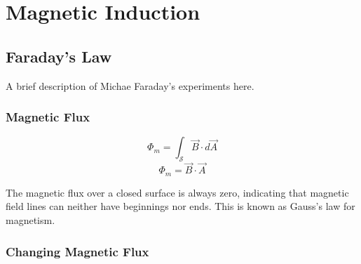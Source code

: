 \chapter{Magnetic Induction}
\label{chapter:faradays-law}


\section{Faraday's Law}

A brief description of Michae Faraday's experiments here.

\subsection{Magnetic Flux}
%
%

%  
%    
\begin{equation}
  \Phi_m=\int_\mathcal{S}\vec B\cdot d\vec A
\end{equation}
\begin{equation}
  \boxed{ \Phi_m=\vec B\cdot\vec A }
\end{equation} 


%
%
%
%
%  
The magnetic flux over a closed surface is always zero, indicating that
magnetic field lines can neither have beginnings nor ends. This is known as
Gauss's law for magnetism.
%  



\subsection{Changing Magnetic Flux}

